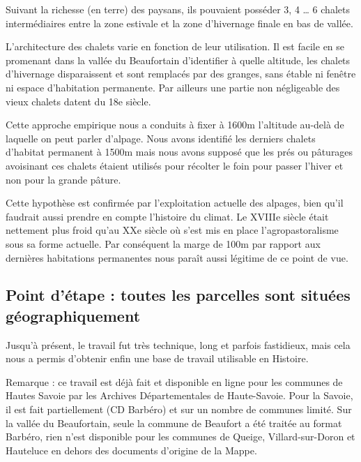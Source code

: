 Suivant la richesse (en terre) des paysans, ils pouvaient posséder 3, 4 … 6 chalets intermédiaires entre la zone estivale et la zone d’hivernage finale en bas de vallée.

L’architecture des chalets varie en fonction de leur utilisation. Il est facile en se promenant dans la vallée du Beaufortain d’identifier à quelle altitude, les chalets d’hivernage disparaissent et sont remplacés par des granges, sans étable ni fenêtre ni espace d’habitation permanente. Par ailleurs une partie non négligeable des vieux chalets datent du 18e siècle. 

Cette approche empirique nous a conduits à fixer à 1600m l’altitude au-delà de laquelle on peut parler d’alpage. Nous avons identifié les derniers chalets d’habitat permanent à 1500m mais nous avons supposé que les prés ou pâturages avoisinant ces chalets étaient utilisés pour récolter le foin pour passer l’hiver et non pour la grande pâture.

Cette hypothèse est confirmée par l’exploitation actuelle des alpages, bien qu’il faudrait aussi prendre en compte l’histoire du climat. Le XVIIIe siècle était nettement plus froid qu’au XXe siècle où s’est mis en place l’agropastoralisme sous sa forme actuelle. Par conséquent la marge de 100m par rapport aux dernières habitations permanentes nous paraît aussi légitime de ce point de vue.




\subsection{Point d'étape : toutes les parcelles sont situées géographiquement}

Jusqu'à présent, le travail fut très technique, long et parfois fastidieux, mais cela nous a permis d'obtenir enfin une base de travail utilisable en Histoire.

Remarque : ce travail est déjà fait et disponible en ligne pour les communes de Hautes Savoie par les Archives Départementales de Haute-Savoie. Pour la Savoie, il est fait partiellement (CD Barbéro) et sur un nombre de communes limité. Sur la vallée du Beaufortain, seule la commune de Beaufort a été traitée au format Barbéro, rien n'est disponible pour les communes de Queige, Villard-sur-Doron et Hauteluce en dehors des documents d'origine de la Mappe. 


